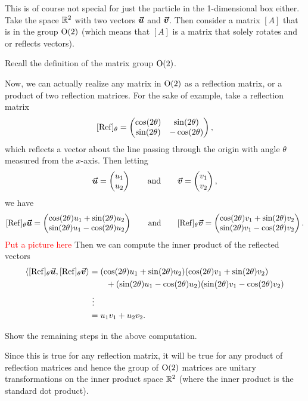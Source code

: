 This is of course not special for just the particle in the 1-dimensional box either. Take the space $\mathbb{R}^2$ with two vectors $\boldsymbol{\boldsymbol{\vec{u}}}$ and $\boldsymbol{\boldsymbol{\vec{v}}}$. Then consider a matrix $[A]$ that is in the group $\mathrm{O}(2)$ (which means that $[A]$ is a matrix that solely rotates and or reflects vectors).
\begin{exercise}
	Recall the definition of the matrix group $\mathrm{O}(2)$.
\end{exercise}
Now, we can actually realize any matrix in $\mathrm{O}(2)$ as a reflection matrix, or a product of two reflection matrices. For the sake of example, take a reflection matrix
\[
[\mathrm{Ref}]_\theta = \begin{pmatrix} \cos (2\theta) & \sin(2\theta) \\ \sin(2\theta) & -\cos(2\theta) \end{pmatrix},
\]
which reflects a vector about the line passing through the origin with angle $\theta$ measured from the $x$-axis.  Then letting
\[
\boldsymbol{\boldsymbol{\vec{u}}} = \begin{pmatrix} u_1 \\ u_2 \end{pmatrix} \qquad \textrm{and} \qquad \boldsymbol{\boldsymbol{\vec{v}}} = \begin{pmatrix} v_1 \\ v_2 \end{pmatrix},
\]
 we have
\[
[\mathrm{Ref}]_\theta \boldsymbol{\boldsymbol{\vec{u}}} = \begin{pmatrix} \cos(2\theta)u_1+\sin(2\theta)u_2 \\  \sin(2\theta)u_1-\cos(2\theta)u_2 \end{pmatrix} \qquad \textrm{and} \qquad [\mathrm{Ref}]_\theta \boldsymbol{\boldsymbol{\vec{v}}} = \begin{pmatrix} \cos(2\theta)v_1+\sin(2\theta)v_2 \\  \sin(2\theta)v_1-\cos(2\theta)v_2 \end{pmatrix}.
\]
\textcolor{red}{Put a picture here}
Then we can compute the inner product of the reflected vectors 
\begin{align*}
\left\langle [\mathrm{Ref}]_\theta \boldsymbol{\boldsymbol{\vec{u}}}, [\mathrm{Ref}]_\theta \boldsymbol{\boldsymbol{\vec{v}}} \right\rangle&= (\cos(2\theta)u_1+\sin(2\theta)u_2)(\cos(2\theta)v_1+\sin(2\theta)v_2 )\\
&\qquad + (\sin(2\theta)u_1-\cos(2\theta)u_2)(\sin(2\theta)v_1-\cos(2\theta)v_2)\\
&~\vdots\\
&= u_1v_1 + u_2v_2.
\end{align*}
\begin{exercise}
	Show the remaining steps in the above computation.
\end{exercise}
Since this is true for any reflection matrix, it will be true for any product of reflection matrices and hence the group of $\mathrm{O}(2)$ matrices are unitary transformations on the inner product space $\mathbb{R}^2$ (where the inner product is the standard dot product).

